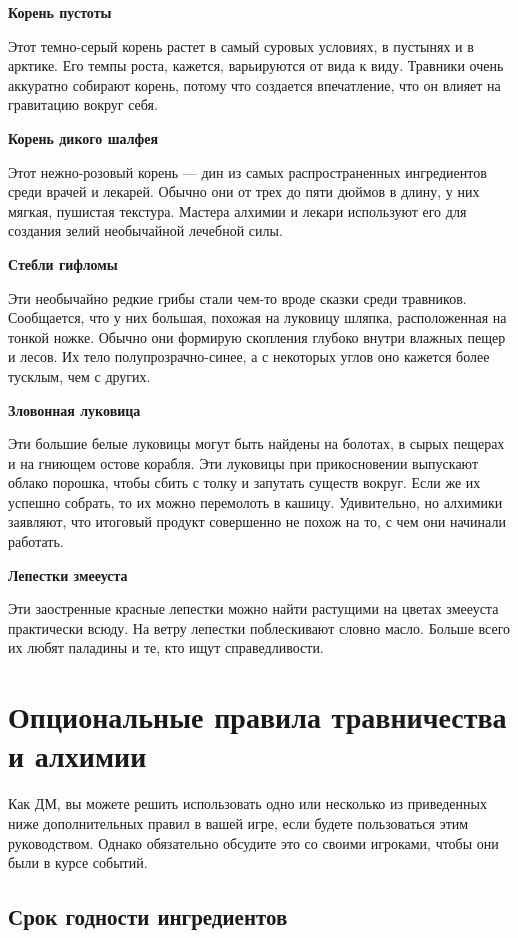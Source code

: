 \documentclass[a4paper, 9pt, twocolumn]{book}
\newcommand{\partc}[2][]{{
		\bigskip
		\noindent
		\hspace{-0.25cm}
		\fontsize{11pt}{13.2}
		\color{sectioncolor}
		\textbf{#2}}
	
	{
		\ifx\relax#1\relax
		\else
		\noindent
		\normalcolor
		\textbf{#1}}
	\bigskip
	\fi
}
\begin{document}
	\partc{Корень пустоты}
	
	\noindent Этот темно-серый корень растет в самый суровых условиях, в пустынях и в арктике. Его темпы роста, кажется, варьируются от вида к виду. Травники очень аккуратно собирают корень, потому что создается впечатление, что он влияет на гравитацию вокруг себя.
	
	\partc{Корень дикого шалфея}
	
	\noindent Этот нежно-розовый корень --- дин из самых распространенных ингредиентов среди врачей и лекарей. Обычно они от трех до пяти дюймов в длину, у них мягкая, пушистая текстура. Мастера алхимии и лекари используют его для создания зелий необычайной лечебной силы.
	
	\partc{Стебли гифломы}
	
	\noindent Эти необычайно редкие грибы стали чем-то вроде сказки среди травников. Сообщается, что у них большая, похожая на луковицу шляпка, расположенная на тонкой ножке. Обычно они формирую скопления глубоко внутри влажных пещер и лесов. Их тело полупрозрачно-синее, а с некоторых углов оно кажется более тусклым, чем с других.
	
	\partc{Зловонная луковица}
	
	\noindent Эти большие белые луковицы могут быть найдены на болотах, в сырых пещерах и на гниющем остове корабля. Эти луковицы при прикосновении выпускают облако порошка, чтобы сбить с толку и запутать существ вокруг. Если же их успешно собрать, то их можно перемолоть в кашицу. Удивительно, но алхимики заявляют, что итоговый продукт совершенно не похож на то, с чем они начинали работать.
	
	\partc{Лепестки змееуста}
	
	\noindent Эти заостренные красные лепестки можно найти растущими на цветах змееуста практически всюду. На ветру лепестки поблескивают словно масло. Больше всего их любят паладины и те, кто ищут справедливости.
	
	
	\chapter{Опциональные правила травничества и алхимии}
	
	Как ДМ, вы можете решить использовать одно или несколько из приведенных ниже дополнительных правил в вашей игре, если будете пользоваться этим руководством. Однако обязательно обсудите это со своими игроками, чтобы они были в курсе событий.
	
	\section{Срок годности ингредиентов}
	
\end{document}
